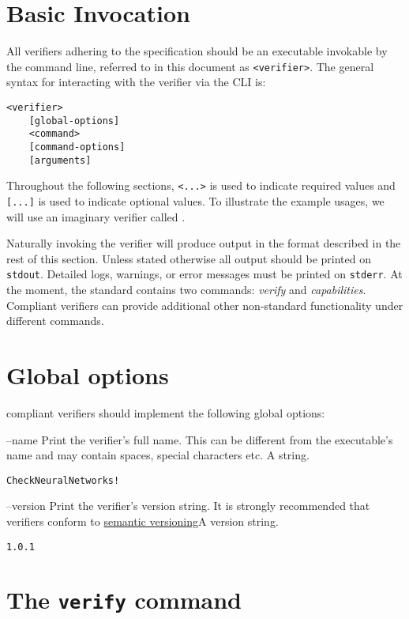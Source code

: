 \section{Basic Invocation}

All verifiers adhering to the \vnnlib{} specification should be an executable invokable by the command line, referred to in this document as \texttt{<verifier>}. The general syntax for interacting with the verifier via the CLI is:
\begin{lstlisting}[style=bash]
<verifier>
    [global-options] 
    <command> 
    [command-options] 
    [arguments] 
\end{lstlisting}
Throughout the following sections, \texttt{<...>} is used to indicate required values and \texttt{[...]} is used to indicate optional values. To illustrate the example usages, we will  use an imaginary verifier called \texttt{\exampleVerifier}.

Naturally invoking the verifier will produce output in the format described in the rest of this section. Unless stated otherwise all output should be printed on \texttt{stdout}. Detailed logs, warnings, or error messages must be printed on \texttt{stderr}.
At the moment, the \vnnlib{} standard contains two commands: \emph{verify} and \emph{capabilities}. Compliant verifiers can provide additional other non-standard functionality under different commands.

\section{Global options}

\vnnlib{} compliant verifiers should implement the following global options:

\clOutputOption
{--name}
{Print the verifier's full name. This can be different from the executable's name and may contain spaces, special characters etc.}
{A string.}
\begin{lstlisting}[style=bash]
%*\exampleVerifier* --name
CheckNeuralNetworks!
\end{lstlisting}

\clOutputOption
{--version}
{Print the verifier's version string. It is strongly recommended that verifiers conform to \href{https://semver.org/}{semantic versioning}}{A version string.}
\begin{lstlisting}[style=bash]
%*\exampleVerifier* --version
1.0.1
\end{lstlisting}


\section{The \texttt{verify} command}
\label{sec:verify_command}

